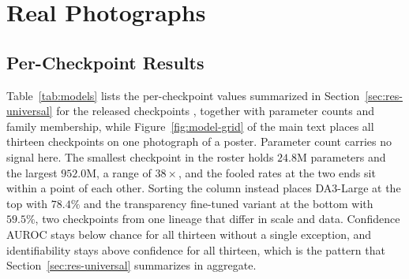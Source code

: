 \documentclass{article} %
\theoremstyle{defstyle}
\theoremstyle{plain}
\begin{document}
\section{Real Photographs}

\subsection{Per-Checkpoint Results}
\label{sec:supp-models}

Table~\ref{tab:models} lists the per-checkpoint values summarized in
Section~\ref{sec:res-universal} for the released checkpoints
\citep{depthanything2024,da32026,depthpro2025,moge2025,moge32026,metric3d2023,unidepth2024,unidepthv22025},
together with parameter counts and family membership, while Figure~\ref{fig:model-grid} of the
main text places all thirteen checkpoints on one photograph of a poster. Parameter count
carries no signal here. The smallest checkpoint in the roster holds $24.8$M parameters and the
largest $952.0$M, a range of $38\times$, and the fooled rates at the two ends sit within a
point of each other. Sorting the column instead places DA3-Large at the top with $78.4\%$ and
the transparency fine-tuned variant at the bottom with $59.5\%$, two checkpoints from one
lineage that differ in scale and data. Confidence AUROC stays below chance for all thirteen
without a single exception, and identifiability stays above confidence for all thirteen, which is
the pattern that Section~\ref{sec:res-universal} summarizes in aggregate.
\end{document}

